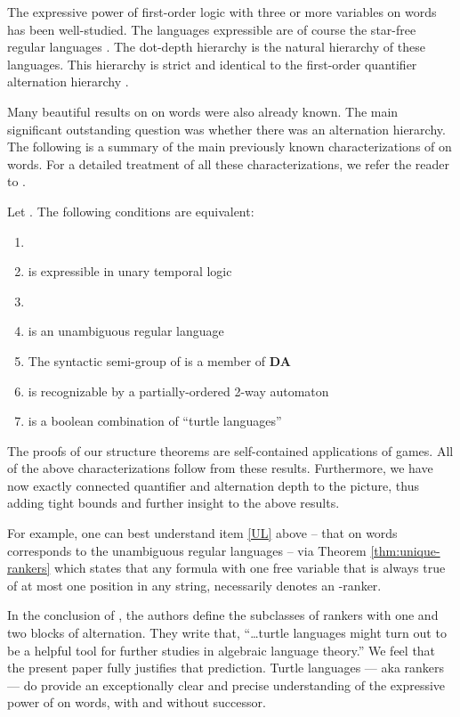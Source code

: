 \documentclass{LMCS}
\begin{document}
The expressive power of first-order logic with three or more variables on
words has been well-studied. The languages expressible are of course the
star-free regular languages \cite{MP71}. The dot-depth hierarchy is the
natural hierarchy of these languages. This hierarchy is strict \cite{BK78}
and identical to the first-order quantifier alternation hierarchy
\cite{T82,T84}.

Many beautiful results on  on words were also already known. The
main significant outstanding question was whether there was an alternation
hierarchy. The following is a summary of the main previously known
characterizations of  on words. For a detailed treatment of all
these characterizations, we refer the reader to \cite{TT01}.

\begin{fact}\label{fact}
  \textup{\cite{EVW97,EVW02,PW97,S76,TW98,STV01}}
  Let . The following conditions are equivalent:
  \setlength{\itemsep}{0pt}
  \begin{enumerate}[(1)]
  \item 
  \item  is expressible in unary temporal logic
  \item 
  \item\label{UL}   is an unambiguous regular language
  \item The syntactic semi-group of  is a member of {\bf DA}
  \item  is recognizable by a partially-ordered 2-way automaton
  \item\label{turtle}  is a boolean combination of ``turtle languages''
  \end{enumerate}
\end{fact}

The proofs of our structure theorems are self-contained applications
of \ef{} games.  All of the above characterizations follow from these
results.  Furthermore, we have now exactly connected quantifier and
alternation depth to the picture, thus adding tight bounds and further
insight to the above results.

For example, one can best understand item \ref{UL} above -- that
 on words corresponds to the unambiguous regular languages
-- via
Theorem \ref{thm:unique-rankers} which states that any 
formula with one free variable that is always true of at most one position
in any string, necessarily denotes an -ranker.

In the conclusion of \cite{STV01}, the authors define the subclasses
of rankers with one and two blocks of alternation.  They write that,
``\ldots turtle languages might turn out to be a helpful tool for
further studies in algebraic language theory.''  We feel that the
present paper fully justifies that prediction.  Turtle languages --- aka
rankers --- do provide an exceptionally clear and precise
understanding of the expressive power of  on words, with and
without successor.
\end{document}
